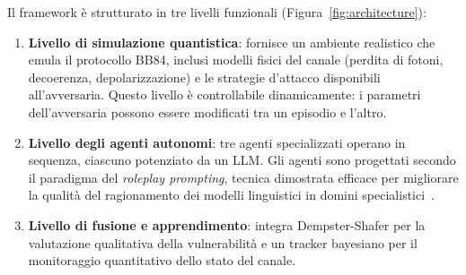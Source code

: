 Il framework è strutturato in tre livelli funzionali (Figura~\ref{fig:architecture}):

\begin{enumerate}
    \item \textbf{Livello di simulazione quantistica}: fornisce un ambiente realistico che emula il protocollo BB84, inclusi modelli fisici del canale (perdita di fotoni, decoerenza, depolarizzazione) e le strategie d'attacco disponibili all'avversaria. Questo livello è controllabile dinamicamente: i parametri dell'avversaria possono essere modificati tra un episodio e l'altro.
    
    \item \textbf{Livello degli agenti autonomi}: tre agenti specializzati operano in sequenza, ciascuno potenziato da un LLM. Gli agenti sono progettati secondo il paradigma del \emph{roleplay prompting}, tecnica dimostrata efficace per migliorare la qualità del ragionamento dei modelli linguistici in domini specialistici~\cite{wang2023roleplay}.
    
    \item \textbf{Livello di fusione e apprendimento}: integra Dempster-Shafer per la valutazione qualitativa della vulnerabilità e un tracker bayesiano per il monitoraggio quantitativo dello stato del canale.
\end{enumerate}

